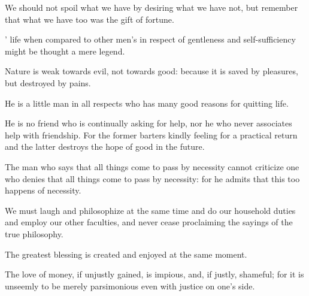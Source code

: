 \documentclass{stex}
\begin{document}
\vspace{0.5em}
\begin{sparagraph}[title=35]
  We should not spoil what we have by desiring what we have not, but remember that what we have too was the gift of fortune.
\end{sparagraph}
\vspace{0.5em}
\begin{sparagraph}[title=36]
  ’ life when compared to other men’s in respect of gentleness and self-sufficiency might be thought a mere legend.
\end{sparagraph}
\vspace{0.5em}
\begin{sparagraph}[title=37]
  Nature is weak towards evil, not towards good: because it is saved by pleasures, but destroyed by pains.
\end{sparagraph}
\vspace{0.5em}
\begin{sparagraph}[title=38]
  He is a little man in all respects who has many good reasons for quitting life.
\end{sparagraph}
\vspace{0.5em}
\begin{sparagraph}[title=39]
  He is no friend who is continually asking for help, nor he who never associates help with friendship.
  For the former barters kindly feeling for a practical return and the latter destroys the hope of good in the future.
\end{sparagraph}
\vspace{0.5em}
\begin{sparagraph}[title=40]
  The man who says that all things come to pass by necessity cannot criticize one who denies that all things come to pass by necessity: for he admits that this too happens of necessity.
\end{sparagraph}
\vspace{0.5em}
\begin{sparagraph}[title=41]
  We must laugh and philosophize at the same time and do our household duties and employ our other faculties, and never cease proclaiming the sayings of the true philosophy.
\end{sparagraph}
\vspace{0.5em}
\begin{sparagraph}[title=42]
  The greatest blessing is created and enjoyed at the same moment.
\end{sparagraph}
\vspace{0.5em}
\begin{sparagraph}[title=43]
  The love of money, if unjustly gained, is impious, and, if justly, shameful; for it is unseemly to be merely parsimonious even with justice on one's side.
\end{sparagraph}
\end{document}
